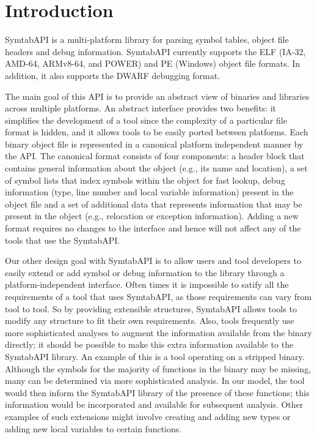 \section{Introduction}
\label{sec:intro}

SymtabAPI is a multi-platform library for parsing symbol tables,
object file headers and debug information. SymtabAPI currently
supports the ELF (IA-32, AMD-64, ARMv8-64, and POWER) and PE
(Windows) object file formats. In addition, it also supports the DWARF
debugging format.

The main goal of this API is to provide an abstract view of binaries and
libraries across multiple platforms. An abstract interface provides two
benefits: it simplifies the development of a tool since the complexity of a
particular file format is hidden, and it allows tools to be easily ported
between platforms. Each binary object file is represented in a canonical
platform independent manner by the API. The canonical format consists of four
components: a header block that contains general information about the object
(e.g., its name and location), a set of symbol lists that index symbols within
the object for fast lookup, debug information (type, line number and local
variable information) present in the object file and a set of additional data
that represents information that may be present in the object (e.g., relocation
or exception information). Adding a new format requires no changes to the
interface and hence will not affect any of the tools that use the SymtabAPI.

Our other design goal with SymtabAPI is to allow users and tool developers to
easily extend or add symbol or debug information to the library through a
platform-independent interface. Often times it is impossible to satify all the
requirements of a tool that uses SymtabAPI, as those requirements can vary from
tool to tool. So by providing extensible structures, SymtabAPI allows tools to
modify any structure to fit their own requirements. Also, tools frequently use
more sophisticated analyses to augment the information available from the binary
directly; it should be possible to make this extra information available to the
SymtabAPI library. An example of this is a tool operating on a stripped binary.
Although the symbols for the majority of functions in the binary may be missing,
many can be determined via more sophisticated analysis. In our model, the tool
would then inform the SymtabAPI library of the presence of these functions; this
information would be incorporated and available for subsequent analysis. Other
examples of such extensions might involve creating and adding new types or
adding new local variables to certain functions.
